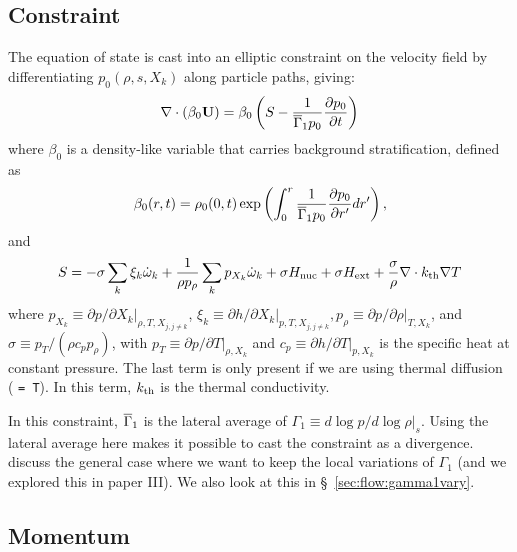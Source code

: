 \subsection{Constraint}

The equation of state is cast into an elliptic constraint on the
velocity field by differentiating $p_0(\rho, s, X_k)$ along particle
paths, giving:
\begin{equation}
\nabla \cdot (\beta_0 {\bf U}) = 
   \beta_0 \left ( S - \frac{1}{\overline{\Gamma}_1 p_0} \frac{\partial p_0}{\partial t} \right )
\label{eq:U divergence}
\end{equation}
where $\beta_0$ is a density-like variable that carries background
 stratification, defined as
\begin{equation}
\beta_0(r,t) = \rho_0(0,t)\exp\left(\int_0^r\frac{1}{\overline{\Gamma}_1 p_0}\frac{\partial p_0}{\partial r'}dr'\right),
\end{equation}
and 
\begin{equation}
S = -\sigma\sum_k\xi_k\dot{\omega}_k + \frac{1}{\rho p_\rho}\sum_k p_{X_k}\dot{\omega}_k + \sigma{H_{\rm nuc}} + \sigma{H_{\rm ext}} + \frac{\sigma}{\rho} \nabla \cdot k_{\rm th} \nabla T
\label{eq:flow:S}
\end{equation}
where $p_{X_k} \equiv \left. \partial p / \partial X_k
\right|_{\rho,T,X_{j,j\ne k}}$, $\xi_k \equiv \left. \partial h / 
\partial X_k \right |_{p,T,X_{j,j\ne k}}, 
p_\rho \equiv \left. \partial p/\partial \rho \right |_{T, X_k}$, and
$\sigma \equiv p_T/(\rho c_p p_\rho)$, with
$p_T \equiv \left. \partial p / \partial T \right|_{\rho, X_k}$ and
$c_p \equiv \left.  \partial h / \partial T
\right|_{p,X_k}$ is the specific heat at constant pressure.   The last
term is only present if we are using thermal diffusion ( {\tt = T}).  In this term, $k_{\rm th}$ is the thermal conductivity.

In this constraint, $\overline{\Gamma}_1$ is the lateral average of
$\Gamma_1 \equiv d\log p / d\log \rho |_s$.  Using the lateral average
here makes it possible to cast the constraint as a
divergence.  \cite{KP:2012} discuss the general case where we want to
keep the local variations of $\Gamma_1$ (and we explored this in paper
III).  We also look at this in \S~\ref{sec:flow:gamma1vary}.




\subsection{Momentum}

